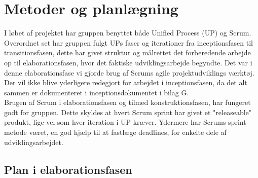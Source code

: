 \section{Metoder og planlægning}
I løbet af projektet har gruppen benyttet både Unified Process (UP) og Scrum. Overordnet set har gruppen fulgt UPs faser og iterationer fra inceptionsfasen til transitionsfasen, dette har givet struktur og målrettet det forberedende arbejde op til elaborationsfasen, hvor det faktiske udviklingsarbejde begyndte. Det var i denne elaborationsfase vi gjorde brug af Scrums agile projektudviklings værktøj. 
Der vil ikke blive yderligere redegjort for arbejdet i inceptionsfasen, da det alt sammen er dokumenteret i inceptionsdokumentet i bilag G.  \\
Brugen af Scrum i elaborationsfasen og tilmed konstruktionsfasen, har fungeret godt for gruppen. Dette skyldes at hvert Scrum sprint har givet et "releaseable" produkt, lige vel som hver iteration i UP kræver. Ydermere har Scrums sprint metode været, en god hjælp til at fastlæge deadlines, for enkelte dele af udviklingsarbejdet.

\subsection{Plan i elaborationsfasen}
